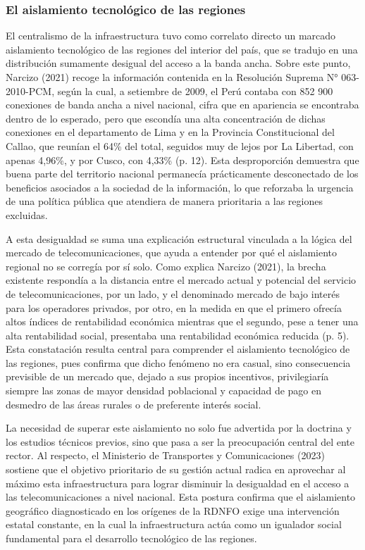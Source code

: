 \subsubsection{El aislamiento tecnológico de las regiones}
El centralismo de la infraestructura tuvo como correlato directo un marcado aislamiento tecnológico de las regiones del interior del país, que se tradujo en una distribución sumamente desigual del acceso a la banda ancha. Sobre este punto, Narcizo (2021) recoge la información contenida en la Resolución Suprema N° 063-2010-PCM, según la cual, a setiembre de 2009, el Perú contaba con 852 900 conexiones de banda ancha a nivel nacional, cifra que en apariencia se encontraba dentro de lo esperado, pero que escondía una alta concentración de dichas conexiones en el departamento de Lima y en la Provincia Constitucional del Callao, que reunían el 64\% del total, seguidos muy de lejos por La Libertad, con apenas 4,96\%, y por Cusco, con 4,33\% (p. 12). Esta desproporción demuestra que buena parte del territorio nacional permanecía prácticamente desconectado de los beneficios asociados a la sociedad de la información, lo que reforzaba la urgencia de una política pública que atendiera de manera prioritaria a las regiones excluidas.

A esta desigualdad se suma una explicación estructural vinculada a la lógica del mercado de telecomunicaciones, que ayuda a entender por qué el aislamiento regional no se corregía por sí solo. Como explica Narcizo (2021), la brecha existente respondía a la distancia entre el mercado actual y potencial del servicio de telecomunicaciones, por un lado, y el denominado mercado de bajo interés para los operadores privados, por otro, en la medida en que el primero ofrecía altos índices de rentabilidad económica mientras que el segundo, pese a tener una alta rentabilidad social, presentaba una rentabilidad económica reducida (p. 5). Esta constatación resulta central para comprender el aislamiento tecnológico de las regiones, pues confirma que dicho fenómeno no era casual, sino consecuencia previsible de un mercado que, dejado a sus propios incentivos, privilegiaría siempre las zonas de mayor densidad poblacional y capacidad de pago en desmedro de las áreas rurales o de preferente interés social.

La necesidad de superar este aislamiento no solo fue advertida por la doctrina y los estudios técnicos previos, sino que pasa a ser la preocupación central del ente rector. Al respecto, el Ministerio de Transportes y Comunicaciones (2023) sostiene que el objetivo prioritario de su gestión actual radica en aprovechar al máximo esta infraestructura para lograr disminuir la desigualdad en el acceso a las telecomunicaciones a nivel nacional. Esta postura confirma que el aislamiento geográfico diagnosticado en los orígenes de la RDNFO exige una intervención estatal constante, en la cual la infraestructura actúa como un igualador social fundamental para el desarrollo tecnológico de las regiones.

